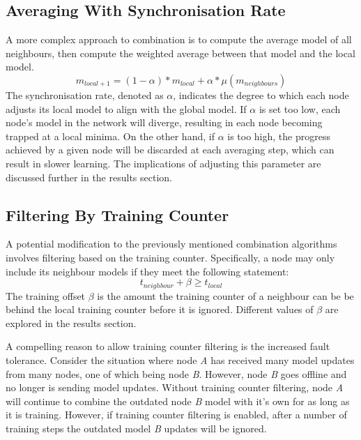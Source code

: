 \subsection{Averaging With Synchronisation Rate}
A more complex approach to combination is to compute the average model of all neighbours, then compute the weighted average between that model and the local model.
\[ m_{local+1} = (1 - \alpha) * m_{local} + \alpha * \mu ( m_{neighbours} )\]
The synchronisation rate, denoted as $\alpha$, indicates the degree to which each node adjusts its local model to align with the global model. If $\alpha$ is set too low, each node's model in the network will diverge, resulting in each node becoming trapped at a local minima. On the other hand, if $\alpha$ is too high, the progress achieved by a given node will be discarded at each averaging step, which can result in slower learning. The implications of adjusting this parameter are discussed further in the results section.

\subsection{Filtering By Training Counter}
A potential modification to the previously mentioned combination algorithms involves filtering based on the training counter. Specifically, a node may only include its neighbour models if they meet the following statement:
\[t_{neighbour} + \beta \ge t_{local} \]
The training offset $\beta$ is the amount the training counter of a neighbour can be be behind the local training counter before it is ignored. Different values of $\beta$ are explored in the results section.

A compelling reason to allow training counter filtering is the increased fault tolerance. Consider the situation where node \emph{A} has received many model updates from many nodes, one of which being node \emph{B}. However, node \emph{B} goes offline and no longer is sending model updates. Without training counter filtering, node \emph{A} will continue to combine the outdated node \emph{B} model with it's own for as long as it is training. However, if training counter filtering is enabled, after a number of training steps the outdated model \emph{B} updates will be ignored.

